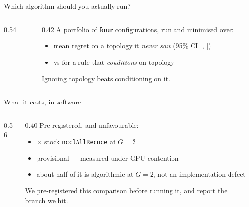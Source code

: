 \documentclass[aspectratio=169,10pt]{beamer}
\begin{document}
\begin{frame}{Which algorithm should you actually run?}
\begin{columns}[T]
\begin{column}{0.54\textwidth}
\end{column}
\begin{column}{0.42\textwidth}\small
A portfolio of \textbf{four} configurations, run and minimised over:
\begin{itemize}\small
  \item \SelUnseenTopoMean{} mean regret on a topology it \emph{never saw}
        (95\% CI [\SelUnseenTopoLo, \SelUnseenTopoHi])
  \item vs \SelCondTopoMean{} for a rule that \emph{conditions} on topology
\end{itemize}
\vspace{4pt}
Ignoring topology beats conditioning on it.
\end{column}
\end{columns}
\end{frame}

\begin{frame}{What it costs, in software}
\begin{columns}[T]
\begin{column}{0.56\textwidth}
\end{column}
\begin{column}{0.40\textwidth}\small
Pre-registered, and unfavourable:
\begin{itemize}\small
  \item \PinCostGeo$\times$ stock \texttt{ncclAllReduce} at $G{=}2$
  \item provisional --- measured under GPU contention
  \item about half of it is algorithmic at $G{=}2$, not an implementation defect
\end{itemize}
\vspace{4pt}
We pre-registered this comparison before running it, and report the branch we hit.
\end{column}
\end{columns}
\end{frame}
\end{document}
